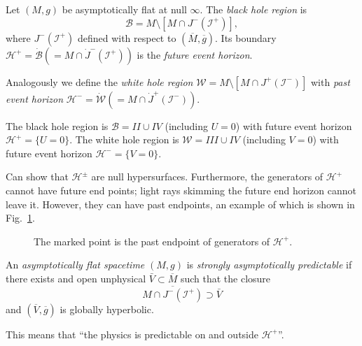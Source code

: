 \begin{definition}
  Let $(M, g)$ be asymptotically flat at null $\infty$. The \emph{black hole region} is
  \begin{equation}
    \mathcal{B} = M \setminus \left[ M \cap J^- (\mathscr{I}^+) \right],
  \end{equation}
  where $J^-(\mathscr{I}^+)$ defined with respect to $(\overline{M}{}, \overline{g}{})$.
  Its boundary $\mathcal{H}^+ = \dot{\mathcal{B}} (= M \cap \dot{J}^-(\mathscr{I}^+))$ is the \emph{future event horizon}.
\end{definition}
\begin{definition}
  Analogously we define the \emph{white hole region} $\mathcal{W} = M \setminus \left[ M \cap J^+ (\mathscr{I}^-) \right]$ with \emph{past event horizon} $\mathcal{H}^- = \dot{\mathcal{W}} (= M \cap \dot{J}^+ (\mathscr{I}^-))$.
\end{definition}

\begin{example}[Kruskal]
  The black hole region is $\mathcal{B} = II \cup IV$ (including $U = 0$) with future event horizon $\mathcal{H}^+ = \{U = 0\}$.
  The white hole region is $\mathcal{W} = III \cup IV$ (including $V = 0$) with future event horizon $\mathcal{H}^- = \{V = 0\}$.
\end{example}

\begin{claim}
  Can show that $\mathcal{H}^{\pm}$ are null hypersurfaces.
  Furthermore, the generators of $\mathcal{H}^+$ cannot have future end points; light rays skimming the future end horizon cannot leave it.
  However, they can have past endpoints, an example of which is shown in Fig.~\ref{fig:l12f3}.
\end{claim}
\begin{figure}[tbhp]
  \centering
  \def\svgwidth{0.4\columnwidth}
  
  \caption{The marked point is the past endpoint of generators of $\mathcal{H}^+$.}
  \label{fig:l12f3}
\end{figure}

\begin{definition}[]
  An \emph{asymptotically flat spacetime} $(M, g)$ is \emph{strongly asymptotically predictable} if there exists and open unphysical $\bar{V}{} \subset \overline{M}{}$ such that the closure
  \begin{equation}
    \overline{M \cap J^-(\mathscr{I}^+)}{} \supset \bar{V}{}
  \end{equation}
  and $(\overline{V}{}, \overline{g}{})$ is globally hyperbolic.
\end{definition}
\begin{remark}
  This means that ``the physics is predictable on and outside $\mathcal{H}^+$''.
\end{remark}

